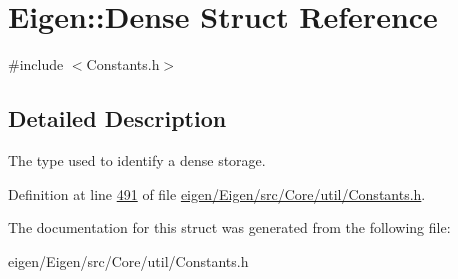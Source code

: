 \hypertarget{struct_eigen_1_1_dense}{}\section{Eigen\+:\+:Dense Struct Reference}
\label{struct_eigen_1_1_dense}


{\ttfamily \#include $<$Constants.\+h$>$}



\subsection{Detailed Description}
The type used to identify a dense storage. 

Definition at line \hyperlink{eigen_2_eigen_2src_2_core_2util_2_constants_8h_source_l00491}{491} of file \hyperlink{eigen_2_eigen_2src_2_core_2util_2_constants_8h_source}{eigen/\+Eigen/src/\+Core/util/\+Constants.\+h}.



The documentation for this struct was generated from the following file\+:\begin{DoxyCompactItemize}
\item 
eigen/\+Eigen/src/\+Core/util/\+Constants.\+h\end{DoxyCompactItemize}
